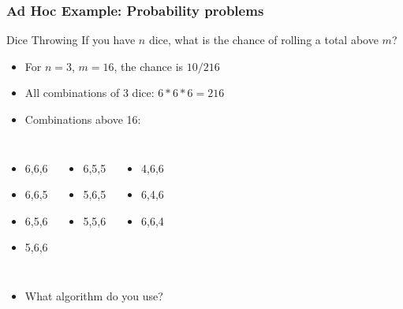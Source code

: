 \documentclass{beamer}
\begin{document}
\begin{frame}
  \frametitle{Ad Hoc Example: Probability problems}

  {\smaller 
    \begin{block}{Dice Throwing}
      If you have $n$ dice, what is the chance of rolling a total above $m$?
    \end{block}

    \begin{itemize}
    \item {} For $n=3$, $m=16$, the chance is $10/216$

      \bigskip

    \item All combinations of 3 dice: $6*6*6 = 216$
    \item Combinations above 16:
    \end{itemize}

    \begin{columns}[T]
      \begin{itemize}
      \item 6,6,6
      \item 6,6,5
      \item 6,5,6
      \item 5,6,6
      \end{itemize}
      \begin{itemize}
      \item 6,5,5
      \item 5,6,5
      \item 5,5,6
      \end{itemize}
      \begin{itemize}
      \item 4,6,6
      \item 6,4,6
      \item 6,6,4
      \end{itemize}
    \end{columns}

    \medskip

    \begin{itemize}
    \item What algorithm do you use?
    \end{itemize}
  }
\end{frame}
\end{document}
